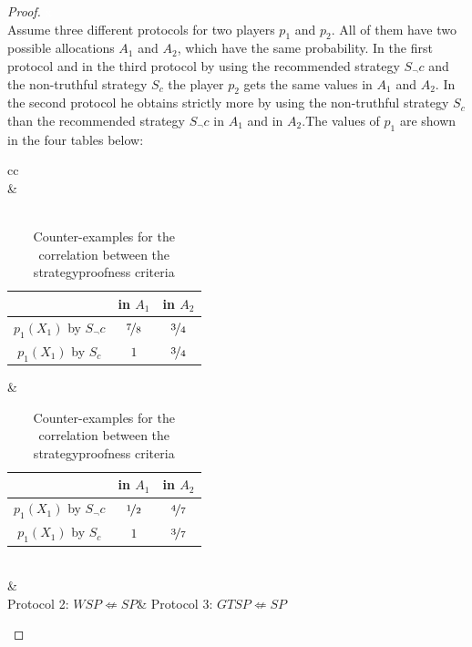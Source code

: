 \begin{proof}
\textcolor{white}{x}\\
\newline
Assume three different protocols for two players $p_1$ and $p_2$. All of them have two possible allocations $A_1$ and $A_2$, which have the same probability. In the first protocol and in the third protocol by using the recommended strategy $S_\neg c$ and the non-truthful strategy $S_c$ the player $p_2$ gets the same values in $A_1$ and $A_2$. In the second protocol he obtains strictly more by using the non-truthful strategy $S_c$  than the recommended strategy $S_\neg c$ in $A_1$ and in $A_2$.The values of $p_1$ are shown in the four tables below:\\
\begin{table}[htb]
		\centering
		\renewcommand{\arraystretch}{1.2}
		\begin{tabular}{cc}
			 \\	
 		&\\ 
\\
\begin{tabular}{c|cc}
		& in $A_1$& in $A_2$\\
		\hline
		$p_1(X_1)$ by $S_\neg c$ & {$\nicefrac{7}{8}$} & $\nicefrac{3}{4}$\\ 
  $p_1(X_1)$ by $S_c$& $1$ & {$\nicefrac{3}{4}$}\\ 
 		\end{tabular}&\begin{tabular}{c|cc}
		& in $A_1$& in $A_2$\\
		\hline
		$p_1(X_1)$ by $S_\neg c$ & {$\nicefrac{1}{2}$} & $\nicefrac{4}{7}$\\ 
  $p_1(X_1)$ by $S_c$& $1$ & {$\nicefrac{3}{7}$}\\ 
 		\end{tabular}\\	 
 		&\\
Protocol 2: $WSP \not\Leftarrow SP$& Protocol 3: $GTSP \not\Leftarrow SP$
\end{tabular}
\caption{Counter-examples for the correlation between the strategyproofness criteria}\label{234}
\end{table}


\end{proof}
